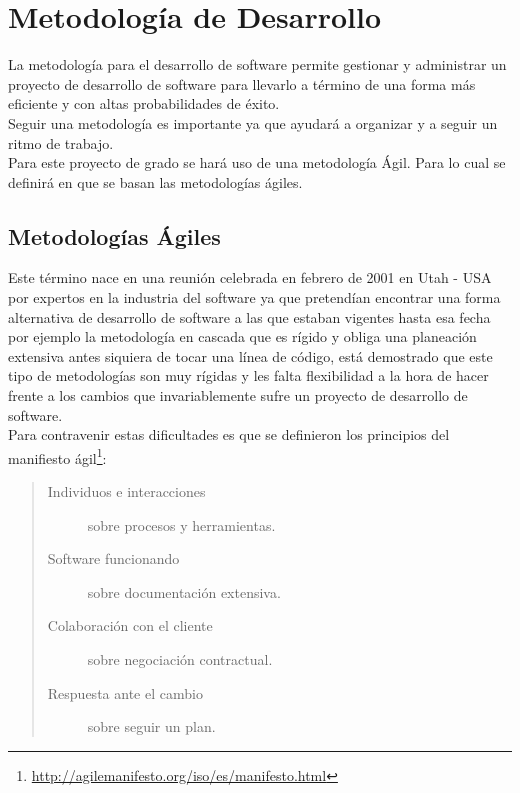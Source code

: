 
 \chapter{Metodología de Desarrollo}
 \label{cha:metodologia_de_desarrollo}

   La metodología para el desarrollo de software permite gestionar y administrar un proyecto de desarrollo de software para llevarlo a término de una forma más eficiente y con altas probabilidades de éxito.\\
   Seguir una metodología es importante ya que ayudará a organizar y a seguir un ritmo de trabajo.\\
   Para este proyecto de grado se hará uso de una metodología Ágil. Para lo cual se definirá en que se basan las metodologías ágiles.\\


   \section{Metodologías Ágiles}
   \label{sec:metodologias_agiles}

   Este término nace en una reunión celebrada en febrero de 2001 en Utah - USA por expertos en la industria del software ya que pretendían encontrar una forma alternativa de desarrollo de software a las que estaban vigentes hasta esa fecha por ejemplo la metodología en cascada que es rígido y obliga una planeación extensiva antes siquiera de tocar una línea de código, está demostrado que este tipo de metodologías son muy rígidas y les falta flexibilidad a la hora de hacer frente a los cambios que invariablemente sufre un proyecto de desarrollo de software.\\



   Para contravenir estas dificultades es que se definieron los principios del manifiesto ágil\footnote{\url{http://agilemanifesto.org/iso/es/manifesto.html}}:

   \begin{quote}
     \begin{description}
       \item[Individuos e interacciones] sobre procesos y herramientas.
       \item[Software funcionando] sobre documentación extensiva.
       \item[Colaboración con el cliente] sobre negociación contractual.
       \item[Respuesta ante el cambio] sobre seguir un plan.
     \end{description}
   \end{quote}

